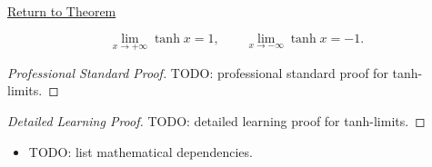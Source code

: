 \newpage
{}
\label{prf:tanh-limits}

\begin{remark*}[Return]
\hyperref[prop:tanh-limits]{Return to Theorem}
\end{remark*}

\begin{proposition*}[Limits of $$]
\[
  \lim_{x \to +\infty} \tanh x = 1,
  \qquad
  \lim_{x \to -\infty} \tanh x = -1.
\]

\smallskip\noindent
\end{proposition*}

\begin{proof}[Professional Standard Proof]
\LRAProofBodyStart
TODO: professional standard proof for tanh-limits.
\end{proof}

\begin{proof}[Detailed Learning Proof]
\LRAProofBodyStart
TODO: detailed learning proof for tanh-limits.
\end{proof}

\begin{remark*}
\end{remark*}

\begin{dependencies}
\begin{itemize}
  \item TODO: list mathematical dependencies.
\end{itemize}
\end{dependencies}

\clearpage
